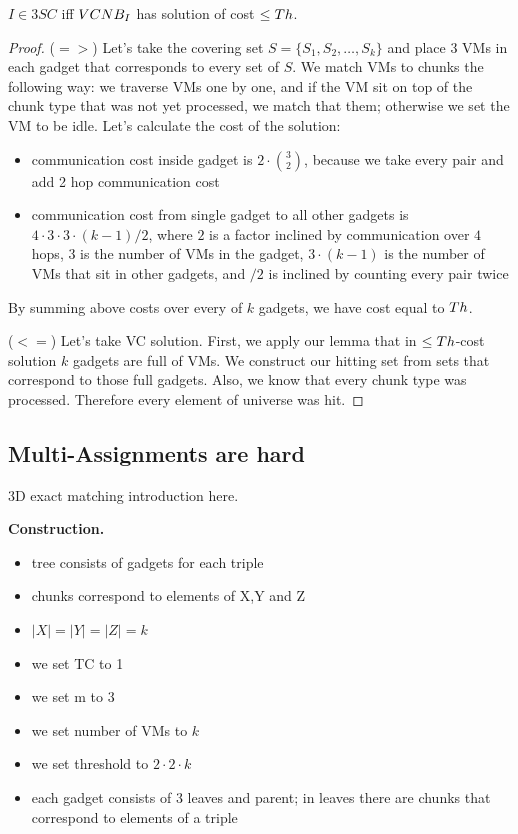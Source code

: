 \begin{theorem}
$I \in 3SC$ iff $VCNB_I$ has solution of cost $\leq Th$.
\end{theorem}
\begin{proof}

($=>$) Let's take the covering set $S = \{S_1, S_2, \ldots, S_k\}$ and place $3$ VMs in each gadget that
corresponds to every set of $S$. We match VMs to chunks the following
way: we traverse VMs one by one, and if the VM sit on top of the chunk
type that was not yet processed, we match that them; otherwise we set
the VM to be idle. Let's calculate the cost of the solution:
\begin{itemize}
\item communication cost inside gadget is $2 \cdot {3 \choose 2}$,
  because we take every pair and add 2 hop communication cost
\item communication cost from single gadget to all other gadgets is $4
  \cdot 3 \cdot 3 \cdot (k - 1) / 2$, where $2$ is a factor inclined by
  communication over $4$ hops, $3$ is the number of VMs in the gadget,
  $3 \cdot (k-1)$ is the number of VMs that sit in other gadgets, and
  $/2$ is inclined by counting every pair twice
\end{itemize}

By summing above costs over every of $k$ gadgets, we have cost equal
to $Th$.

($<=$) Let's take VC solution. First, we apply our lemma that in $\leq
Th$-cost
solution $k$ gadgets are full of VMs. We construct our hitting set from
sets that correspond to those full gadgets. Also, we know that every
chunk type was processed. Therefore every element of universe was hit.
\end{proof}

\subsection{Multi-Assignments are hard}\label{ssec:fprsma}

3D exact matching introduction here.

\textbf{Construction.}

\begin{itemize}
\item tree consists of gadgets for each triple
\item chunks correspond to elements of X,Y and Z
\item $|X| = |Y| = |Z| = k$
\item we set TC to 1
\item we set m to 3
\item we set number of VMs to $k$
\item we set threshold to $2 \cdot 2 \cdot k$
\item each gadget consists of 3 leaves and parent; in leaves there are
  chunks that correspond to elements of a triple
\end{itemize}

